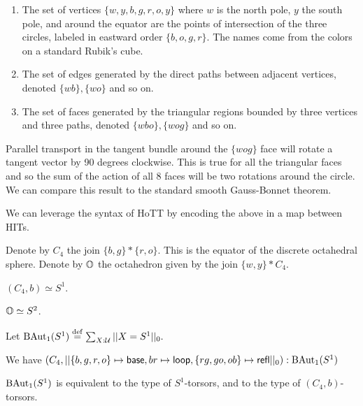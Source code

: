 \documentclass[12pt]{article}
\begin{document}
\begin{enumerate}
\item The set of vertices \( \{w, y, b, g, r, o, y\} \) where \( w \) is the north pole, \( y \) the south pole, and around the equator are the points of intersection of the three circles, labeled in eastward order \( \{b, o, g, r\} \). The names come from the colors on a standard Rubik's cube.
\item The set of edges generated by the direct paths between adjacent vertices, denoted \( \{wb\}, \{wo\}  \) and so on.
\item The set of faces generated by the triangular regions bounded by three vertices and three paths, denoted \( \{wbo\}, \{wog\} \) and so on.
\end{enumerate}

Parallel transport in the tangent bundle around the \( \{wog\} \) face will rotate a tangent vector by 90 degrees clockwise. This is true for all the triangular faces and so the sum of the action of all 8 faces will be two rotations around the circle. We can compare this result to the standard smooth Gauss-Bonnet theorem.

We can leverage the syntax of HoTT by encoding the above in a map between HITs.

\begin{mydef}
Denote by \( C_4 \) the join \( \{b, g\}*\{r, o\} \). This is the equator of the discrete octahedral sphere. Denote by \( \mathbb{O} \) the octahedron given by the join \( \{w, y\}* C_4 \).
\end{mydef}

\begin{mylemma}
\( (C_4, b)\simeq S^1 \).
\end{mylemma}

\begin{mylemma}
\( \mathbb{O}\simeq S^2 \).
\end{mylemma}

\begin{mydef}
Let \( \mathrm{BAut}_1(S^1)\stackrel{\mathrm{def}}{=} \sum_{X:\mathcal{U}}||X=S^1||_0. \)
\end{mydef}

\begin{mylemma}
We have \( (C_4, ||\{b, g, r, o\}\mapsto \mathsf{base}, br\mapsto \mathsf{loop}, \{rg, go, ob\}\mapsto \mathsf{refl} ||_0):\mathrm{BAut}_1(S^1) \)
\end{mylemma}

\begin{mylemma}
\( \mathrm{BAut}_1(S^1) \) is equivalent to the type of \( S^1 \)-torsors, and to the type of \( (C_4,b) \)-torsors.
\end{mylemma}
\end{document}
